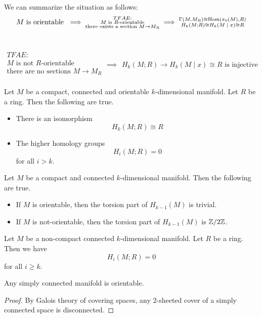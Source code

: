 \documentclass[a4paper]{article}
\begin{document}
We can summarize the situation as follows: $$M\text{ is orientable }\implies\substack{TFAE:\\M\text{ is }R\text{-orientable}\\\text{there exists a section }M\to M_R\\}\implies\substack{\Gamma(M,M_R)\cong\operatorname{Hom}(\pi_0(M),R)\\H_k(M;R)\cong H_k(M\;|\;x)\cong R}$$~

$$\substack{TFAE:\\M\text{ is not }R\text{-orientable}\\\text{there are no sections }M\to M_R\\}\implies\substack{H_k(M;R)\longrightarrow H_k(M\;|\;x)\cong R\text{ is injective}}$$

\begin{crl}{}{} Let $M$ be a compact, connected and orientable $k$-dimensional manifold. Let $R$ be a ring. Then the following are true. 
\begin{itemize}
\item There is an isomorphism $$H_k(M;R)\cong R$$
\item The higher homology groups $$H_i(M;R)=0$$ for all $i>k$. 
\end{itemize}
\end{crl}

\begin{crl}{}{} Let $M$ be a compact and connected $k$-dimensional manifold. Then the following are true. 
\begin{itemize}
\item If $M$ is orientable, then the torsion part of $H_{k-1}(M)$ is trivial. 
\item If $M$ is not-orientable, then the torsion part of $H_{k-1}(M)$ is $\mathbb{Z}/2\mathbb{Z}$. 
\end{itemize}
\end{crl}

\begin{crl}{}{} Let $M$ be a non-compact connected $k$-dimensional manifold. Let $R$ be a ring. Then we have $$H_i(M;R)=0$$ for all $i\geq k$. 
\end{crl}

\begin{crl}{}{} Any simply connected manifold is orientable. \tcbline
\begin{proof}
By Galois theory of covering spaces, any $2$-sheeted cover of a simply connected space is disconnected. 
\end{proof}
\end{crl}
\end{document}
